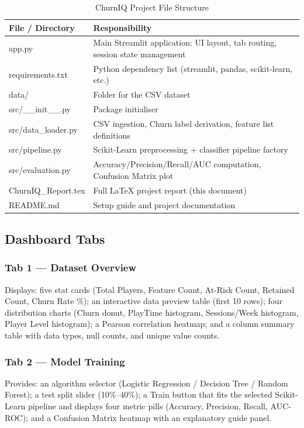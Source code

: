 \documentclass[12pt, a4paper]{article}
\begin{document}
\begin{table}[H]
\centering
\caption{ChurnIQ Project File Structure}
\renewcommand{\arraystretch}{1.3}
\begin{tabular}{>{\ttfamily}l p{8cm}}
\toprule
\textbf{File / Directory} & \textbf{Responsibility} \\
\midrule
app.py                & Main Streamlit application: UI layout, tab routing, session state management \\
requirements.txt      & Python dependency list (streamlit, pandas, scikit-learn, etc.) \\
data/                 & Folder for the CSV dataset \\
src/\_\_init\_\_.py   & Package initialiser \\
src/data\_loader.py   & CSV ingestion, Churn label derivation, feature list definitions \\
src/pipeline.py       & Scikit-Learn preprocessing + classifier pipeline factory \\
src/evaluation.py     & Accuracy/Precision/Recall/AUC computation, Confusion Matrix plot \\
ChurnIQ\_Report.tex   & Full LaTeX project report (this document) \\
README.md             & Setup guide and project documentation \\
\bottomrule
\end{tabular}
\end{table}

\subsection{Dashboard Tabs}

\subsubsection{Tab 1 — Dataset Overview}
Displays: five stat cards (Total Players, Feature Count, At-Risk Count,
Retained Count, Churn Rate \%); an interactive data preview table (first
10 rows); four distribution charts (Churn donut, PlayTime histogram,
Sessions/Week histogram, Player Level histogram); a Pearson correlation
heatmap; and a column summary table with data types, null counts, and
unique value counts.

\subsubsection{Tab 2 — Model Training}
Provides: an algorithm selector (Logistic Regression / Decision Tree /
Random Forest); a test split slider (10\%--40\%); a Train button that
fits the selected Scikit-Learn pipeline and displays four metric pills
(Accuracy, Precision, Recall, AUC-ROC); and a Confusion Matrix heatmap
with an explanatory guide panel.
\end{document}
